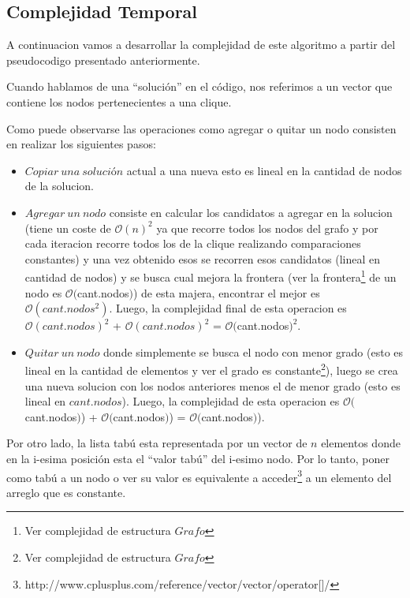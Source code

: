 \subsection{Complejidad Temporal}

 A continuacion vamos a desarrollar la complejidad de este algoritmo a partir del pseudocodigo presentado anteriormente. \newline

 Cuando hablamos de una ``solución'' en el código, nos referimos a un vector que contiene los nodos pertenecientes a una clique. \newline

 Como puede observarse las operaciones como agregar o quitar un nodo consisten en realizar los siguientes pasos: \newline
\begin{itemize}
 \item $Copiar\ una\ solución$ actual a una nueva esto es lineal en la cantidad de nodos de la solucion.
 \item $Agregar\ un\ nodo$ consiste en calcular los candidatos a agregar en la solucion (tiene un coste de $\mathcal{O}(n)^{2}$ ya que recorre todos los nodos del grafo y por cada iteracion recorre todos los de la clique realizando comparaciones constantes) y una vez obtenido esos se recorren esos candidatos (lineal en cantidad de nodos) y se busca cual mejora la frontera (ver la frontera\footnote{Ver complejidad de estructura $Grafo$} de un nodo es $\mathcal{O}($cant.nodos$)$) de esta majera, encontrar el mejor es $\mathcal{O}(cant.nodos^{2})$. Luego, la complejidad final de esta operacion es $\mathcal{O}(cant.nodos)^{2}$ + $\mathcal{O}(cant.nodos)^{2}$ = $\mathcal{O}($cant.nodos$)^{2}$.
 \item $Quitar\ un\ nodo$ donde simplemente se busca el nodo con menor grado (esto es lineal en la cantidad de elementos y ver el grado es constante\footnote{Ver complejidad de estructura $Grafo$}), luego se crea una nueva solucion con los nodos anteriores menos el de menor grado (esto es lineal en $cant.nodos$). Luego, la complejidad de esta operacion es $\mathcal{O}($cant.nodos$)$) + $\mathcal{O}($cant.nodos$)$) = $\mathcal{O}($cant.nodos$)$).
\end{itemize}

 Por otro lado, la lista tabú esta representada por un vector de $n$ elementos donde en la i-esima posición esta el ``valor tabú'' del i-esimo nodo. Por lo tanto, poner como tabú a un nodo o ver su valor es equivalente a acceder\footnote{http://www.cplusplus.com/reference/vector/vector/operator[]/} a un elemento del arreglo que es constante.\newline

